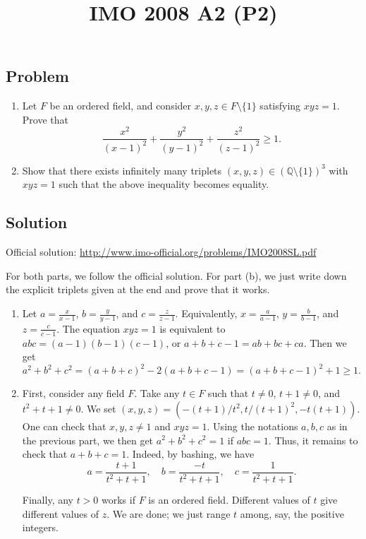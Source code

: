 \documentclass{article}
\title{IMO 2008 A2 (P2)}
\author{}
\date{}
\newcommand{\Q}{\mathbb{Q}}
\begin{document}
\maketitle



\subsection*{Problem}

\begin{enumerate}[label=(\alph*)]

\item
Let $F$ be an ordered field, and consider $x, y, z \in F \setminus \{1\}$ satisfying $xyz = 1$.
Prove that
\[ \frac{x^2}{(x - 1)^2} + \frac{y^2}{(y - 1)^2} + \frac{z^2}{(z - 1)^2} \geq 1. \]

\item
Show that there exists infinitely many triplets $(x, y, z) \in (\Q \setminus \{1\})^3$ with $xyz = 1$ such that the above inequality becomes equality.

\end{enumerate}



\subsection*{Solution}

Official solution: \url{http://www.imo-official.org/problems/IMO2008SL.pdf}

For both parts, we follow the official solution.
For part (b), we just write down the explicit triplets given at the end and prove that it works.

\begin{enumerate}[label=(\alph*)]

\item
Let $a = \frac{x}{x - 1}$, $b = \frac{y}{y - 1}$, and $c = \frac{z}{z - 1}$.
Equivalently, $x = \frac{a}{a - 1}$, $y = \frac{b}{b - 1}$, and $z = \frac{c}{c - 1}$.
The equation $xyz = 1$ is equivalent to $abc = (a - 1)(b - 1)(c - 1)$, or $a + b + c - 1 = ab + bc + ca$.
Then we get
\[ a^2 + b^2 + c^2 = (a + b + c)^2 - 2(a + b + c - 1) = (a + b + c - 1)^2 + 1 \geq 1. \]



\item
First, consider any field $F$.
Take any $t \in F$ such that $t \neq 0$, $t + 1 \neq 0$, and $t^2 + t + 1 \neq 0$.
We set $(x, y, z) = (-(t + 1)/t^2, t/(t + 1)^2, -t(t + 1))$.
One can check that $x, y, z \neq 1$ and $xyz = 1$.
Using the notations $a, b, c$ as in the previous part, we then get $a^2 + b^2 + c^2 = 1$ if $abc = 1$.
Thus, it remains to check that $a + b + c = 1$.
Indeed, by bashing, we have
\[ a = \frac{t + 1}{t^2 + t + 1}, \quad b = \frac{-t}{t^2 + t + 1}, \quad c = \frac{1}{t^2 + t + 1}. \]

Finally, any $t > 0$ works if $F$ is an ordered field.
Different values of $t$ give different values of $z$.
We are done; we just range $t$ among, say, the positive integers.

\end{enumerate}
\end{document}

